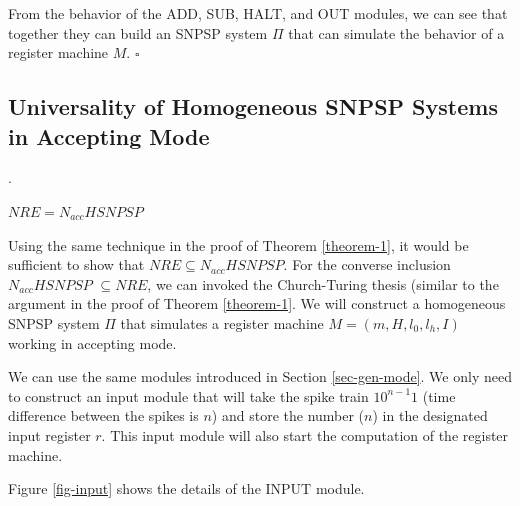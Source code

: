 \documentclass[runningheads,a4paper]{llncs}
\begin{document}

From the behavior of the ADD, SUB, HALT, and OUT modules, we can see that together they can build an SNPSP system $\Pi$ that can simulate the
behavior of a register machine $M$. $\square$ 


\subsection{Universality of Homogeneous SNPSP Systems in Accepting Mode}\label{sec-accept}.
\begin{theorem} \label{theorem-2}
$NRE = N_{acc}HSNPSP$ 
\end{theorem}
  
\proof Using the same technique in the proof of Theorem \ref{theorem-1}, it would be sufficient to show that $NRE \subseteq N_{acc}HSNPSP$. For the
converse inclusion $N_{acc}HSNPSP$ $\subseteq NRE$, we can invoked the Church-Turing thesis (similar to the argument in the proof of Theorem 
\ref{theorem-1}. We will construct a homogeneous SNPSP system $\Pi$ that simulates a register machine $M=(m, H, l_0, l_h, I)$ working in accepting mode.

We can use the same modules introduced in Section \ref{sec-gen-mode}. We only need to construct an input module that will take the spike train
$10^{n-1}1$ (time difference between the spikes is $n$) and store the number ($n$) in the designated input register $r$. This input module will
also start the computation of the register machine.

Figure \ref{fig-input} shows the details of the INPUT module.
\end{document}
